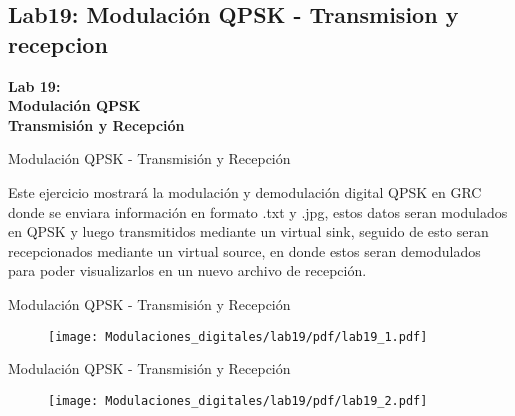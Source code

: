 \subsection{Lab19: Modulación QPSK - Transmision y recepcion}

\begin{frame}{}


\bfseries{\textrm{\large Lab 19: \\ Modulación QPSK \\Transmisión y Recepción}}
\raggedright
\end{frame}

\begin{frame}{Modulación QPSK - Transmisión y Recepción}


\justifying
Este ejercicio mostrará la modulación y demodulación digital QPSK en GRC donde se enviara información en formato .txt y .jpg, estos datos seran modulados en QPSK y luego transmitidos mediante un virtual sink, seguido de esto seran recepcionados mediante un virtual source, en donde estos seran demodulados para poder visualizarlos en un nuevo archivo de recepción. 

\end{frame}
\begin{frame}{Modulación QPSK - Transmisión y Recepción}
\begin{figure}
\texttt{[image: Modulaciones\_digitales/lab19/pdf/lab19\_1.pdf]}
\end{figure}
\end{frame}
\begin{frame}{Modulación QPSK - Transmisión y Recepción}
\begin{figure}
\texttt{[image: Modulaciones\_digitales/lab19/pdf/lab19\_2.pdf]}
\end{figure}
\end{frame}

